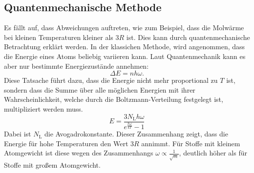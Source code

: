 \subsection{Quantenmechanische Methode}
Es fällt auf, dass Abweichungen auftreten, wie zum Beispiel, dass die Molwärme bei kleinen Temperaturen kleiner als $3R$ ist. Dies kann durch quantenmechanische Betrachtung erklärt werden. In der klassichen Methode, wird angenommen, dass die Energie eines Atoms beliebig variieren kann. Laut Quantenmechanik kann es aber nur bestimmte Energiezustände annehmen:
\begin{equation}
  \Delta E = nh\omega.
\end{equation}
Diese Tatsache führt dazu, dass die Energie nicht mehr proportional zu $T$ ist, sondern dass die Summe über alle möglichen Energien mit ihrer Wahrscheinlichkeit, welche durch die Boltzmann-Verteilung festgelegt ist, multipliziert werden muss.
\begin{equation}
  E = \frac{3N_\mathrm{L}h\omega}{e^{\frac{h\omega}{kT}}-1}
\end{equation}
Dabei ist $N_\mathrm{L}$ die Avogadrokonstante.
Dieser Zusammenhang zeigt, dass die Energie für hohe Temperaturen den Wert $3R$ annimmt. Für Stoffe mit kleinem Atomgewicht ist diese wegen des Zusammenhangs $\omega \propto \frac{1}{\sqrt{m}}$, deutlich höher als für Stoffe mit großem Atomgewicht.
